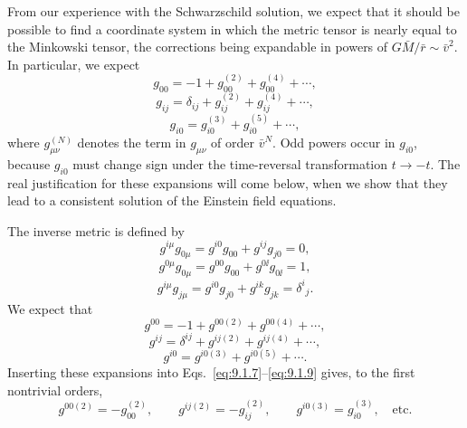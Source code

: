 From our experience with the Schwarzschild solution, we expect that it
should be possible to find a coordinate system in which the metric tensor is
nearly equal to the Minkowski tensor, the corrections being expandable in
powers of \(G\bar M/\bar r\sim\bar v^2\). In particular, we expect
\begin{equation}
  g_{00}=-1+g_{00}^{(2)}+g_{00}^{(4)}+\cdots,
  \tag{9.1.4}\label{eq:9.1.4}
\end{equation}
\begin{equation}
  g_{ij}=\delta_{ij}+g_{ij}^{(2)}+g_{ij}^{(4)}+\cdots,
  \tag{9.1.5}\label{eq:9.1.5}
\end{equation}
\begin{equation}
  g_{i0}=g_{i0}^{(3)}+g_{i0}^{(5)}+\cdots,
  \tag{9.1.6}\label{eq:9.1.6}
\end{equation}
where \(g_{\mu\nu}^{(N)}\) denotes the term in \(g_{\mu\nu}\) of order
\(\bar v^N\). Odd powers occur in \(g_{i0}\), because \(g_{i0}\) must change
sign under the time-reversal transformation \(t\to-t\). The real
justification for these expansions will come below, when we show that they
lead to a consistent solution of the Einstein field equations.

The inverse metric is defined by
\begin{equation}
  g^{i\mu}g_{0\mu}=g^{i0}g_{00}+g^{ij}g_{j0}=0,
  \tag{9.1.7}\label{eq:9.1.7}
\end{equation}
\begin{equation}
  g^{0\mu}g_{0\mu}=g^{00}g_{00}+g^{0\ii}g_{0\ii}=1,
  \tag{9.1.8}\label{eq:9.1.8}
\end{equation}
\begin{equation}
  g^{i\mu}g_{j\mu}=g^{i0}g_{j0}+g^{ik}g_{jk}=\delta^i{}_j.
  \tag{9.1.9}\label{eq:9.1.9}
\end{equation}
We expect that
\begin{equation}
  g^{00}=-1+g^{00(2)}+g^{00(4)}+\cdots,
  \tag{9.1.10}\label{eq:9.1.10}
\end{equation}
\begin{equation}
  g^{ij}=\delta^{ij}+g^{ij(2)}+g^{ij(4)}+\cdots,
  \tag{9.1.11}\label{eq:9.1.11}
\end{equation}
\begin{equation}
  g^{i0}=g^{i0(3)}+g^{i0(5)}+\cdots.
  \tag{9.1.12}\label{eq:9.1.12}
\end{equation}
Inserting these expansions into Eqs.~\eqref{eq:9.1.7}--\eqref{eq:9.1.9}
gives, to the first nontrivial orders,
\begin{equation}
  g^{00(2)}=-g_{00}^{(2)},\qquad
  g^{ij(2)}=-g_{ij}^{(2)},\qquad
  g^{i0(3)}=g_{i0}^{(3)},\quad\text{etc.}
  \tag{9.1.13}\label{eq:9.1.13}
\end{equation}

